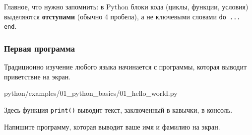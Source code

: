 \begin{infobox}
Главное, что нужно запомнить: в Python блоки кода (циклы, функции, условия) выделяются \textbf{отступами} (обычно 4 пробела), а не ключевыми словами \texttt{do ... end}.
\end{infobox}

\subsubsection*{Первая программа}
Традиционно изучение любого языка начинается с программы, которая выводит приветствие на экран.

\begin{codefile}[python]{python/examples/01_python_basics/01_hello_world.py}
\end{codefile}

Здесь функция \texttt{print()} выводит текст, заключенный в кавычки, в консоль.

\begin{taskbox}
Напишите программу, которая выводит ваше имя и фамилию на экран.
\end{taskbox}
